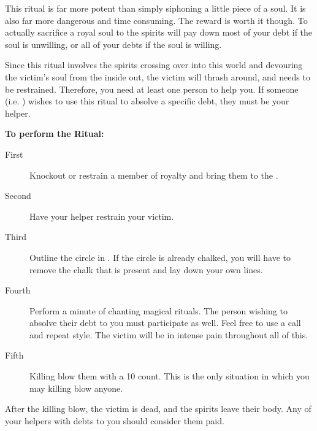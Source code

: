 \documentclass[green]{NeptuneBall}
\begin{document}
\name{\gRitual{}}

This ritual is far more potent than simply siphoning a little piece of a soul. It is also far more dangerous and time consuming. The reward is worth it though. To actually sacrifice a royal soul to the spirits will pay down most of your debt if the soul is unwilling, or all of your debts if the soul is willing.

Since this ritual involves the spirits crossing over into this world and devouring the victim's soul from the inside out, the victim will thrash around, and needs to be restrained. Therefore, you need at least one person to help you. If someone (i.e. \cAriel{}) wishes to use this ritual to absolve a specific debt, they must be your helper.

{\bf To perform the Ritual:}
\begin{description}
\item[First] Knockout or restrain a member of royalty and bring them to the \sRunicCircle{}.
\item[Second] Have your helper restrain your victim.
\item [Third] Outline the circle in \iChalk{\MYname}. If the circle is already chalked, you will have to remove the chalk that is present and lay down your own lines.
\item[Fourth] Perform a minute of chanting magical rituals. The person wishing to absolve their debt to you must participate as well. Feel free to use a call and repeat style. The victim will be in intense pain throughout all of this.
\item[Fifth] Killing blow them with a 10 count. This is the only situation in which you may killing blow anyone.
\end{description}

After the killing blow, the victim is dead, and the spirits leave their body. Any of your helpers with debts to you should consider them paid.
\end{document}
